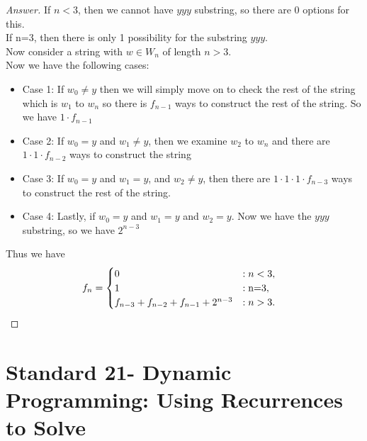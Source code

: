 \documentclass[11pt]{article}
\theoremstyle{definition}
\theoremstyle{definition}
\theoremstyle{definition}
\begin{document}
\begin{proof}[Answer]
If $n<3$, then we cannot have $yyy$ substring, so there are 0 options for this.\\
If n=3, then there is only 1 possibility for the substring $yyy$. \\

Now consider a string with  $w \in W_{n}$  of length $n> 3$.\\
Now we have the following cases:
\begin{itemize}
\item Case 1: If $w_0 \neq y$ then we will simply move on to check the rest of the string which is $w_1$ to $w_n$ so there is $f_{n-1}$ ways to construct the rest of the string. So we have $1\cdot f_{n-1}$
\item Case 2: If $w_0 = y $ and $w_1 \neq y$, then we examine $w_2$ to $w_n$ and there are $1\cdot1\cdot f_{n-2}$ ways to construct the string 
\item Case 3: If $w_0 =y$ and $w_1=y$, and $w_2 \neq y$, then there are $1\cdot1\cdot1\cdot f_{n-3}$ ways to construct the rest of the string. 
\item Case 4: Lastly, if $w_0 = y $ and $w_1 = y$ and $w_2=y$. Now we have the $yyy$ substring, so we have $2^{n-3}$
\end{itemize}

Thus we have \\
\begin{align*}
f_{n} &= \begin{cases} \text{0} & : \text{$n<3$}, \\ 
 \text{1} & : \text{n=3}, \\ 
\text{$ f_{n-3}+f_{n-2}+f_{n-1}+ 2^{n-3}$} & : \text{$n>3$}. 
\end{cases}
\end{align*}

\end{proof}




\newpage
\section{Standard 21- Dynamic Programming: Using Recurrences to Solve}
\end{document}

